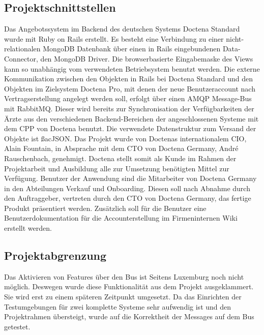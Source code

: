 \subsection{Projektschnittstellen} 
\label{sec:Projektschnittstellen}
Das Angebotssystem im Backend des deutschen Systems Doctena Standard wurde mit Ruby on Rails erstellt. Es besteht eine Verbindung zu einer nicht-relationalen MongoDB Datenbank über einen in Rails eingebundenen Data-Connector, den MongoDB Driver. Die browserbasierte Eingabemaske des Views kann so unabhängig vom verwendeten Betriebsystem benutzt werden.
Die externe Kommunikation zwischen den Objekten in Rails bei Doctena Standard und den Objekten im Zielsystem Doctena Pro, mit denen der neue Benutzeraccount nach Vertragserstellung angelegt werden soll, erfolgt über einen \ac{AMQP} Message-Bus mit RabbitMQ. Dieser wird bereits zur Synchronisation der Verfügbarkeiten der Ärzte aus den verschiedenen Backend-Bereichen der angeschlossenen Systeme mit dem \ac{CPP} von Doctena benutzt. Die verwendete Datenstruktur zum Versand der Objekte ist  ßac{JSON}.
Das Projekt wurde von Doctenas internationalem \ac{CIO}, Alain Fountain, in Absprache mit dem  \ac{CTO} von Doctena Germany, André Rauschenbach, genehmigt. Doctena stellt somit als Kunde im Rahmen der Projektarbeit und Ausbildung alle zur Umsetzung benötigten Mittel zur Verfügung.
Benutzer der Anwendung sind die Mitarbeiter von Doctena Germany in den Abteilungen Verkauf und Onboarding.
Diesen soll nach Abnahme durch den Auftraggeber, vertreten durch den \ac{CTO} von Doctena Germany, das fertige Produkt präsentiert werden. Zusätzlich soll für die Benutzer eine Benutzerdokumentation für die Accounterstellung im Firmeninternen Wiki erstellt werden.

\subsection{Projektabgrenzung} 
\label{sec:Projektabgrenzung}
Das Aktivieren von Features über den Bus ist Seitens Luxemburg noch nicht möglich. Deswegen wurde diese Funktionalität aus dem Projekt ausgeklammert. Sie wird erst zu einem späteren Zeitpunkt umgesetzt. Da das Einrichten der Testumgebungen für zwei komplette Systeme sehr aufwendig ist und den Projektrahmen übersteigt, wurde auf die Korrektheit der Messages auf dem Bus getestet.
